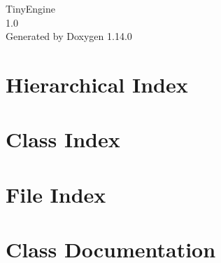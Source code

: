 \documentclass[twoside]{book}
\newcommand{\+}{\discretionary{\mbox{\scriptsize$\hookleftarrow$}}{}{}}
\newcommand{\clearemptydoublepage}{%
    \newpage{\pagestyle{empty}\cleardoublepage}%
  }
\begin{document}
  \raggedbottom
    \hypersetup{pageanchor=false,
                bookmarksnumbered=true,
                pdfencoding=unicode
               }
  \begin{titlepage}
  \vspace*{7cm}
  \begin{center}%
  {\Large Tiny\+Engine}\\
  [1ex]\large 1.\+0 \\
  \vspace*{1cm}
  {\large Generated by Doxygen 1.14.0}\\
  \end{center}
  \end{titlepage}
  \clearemptydoublepage
  \tableofcontents
  \clearemptydoublepage
  \hypersetup{pageanchor=true}

\chapter{Hierarchical Index}

\chapter{Class Index}

\chapter{File Index}

\chapter{Class Documentation}






































\end{document}
